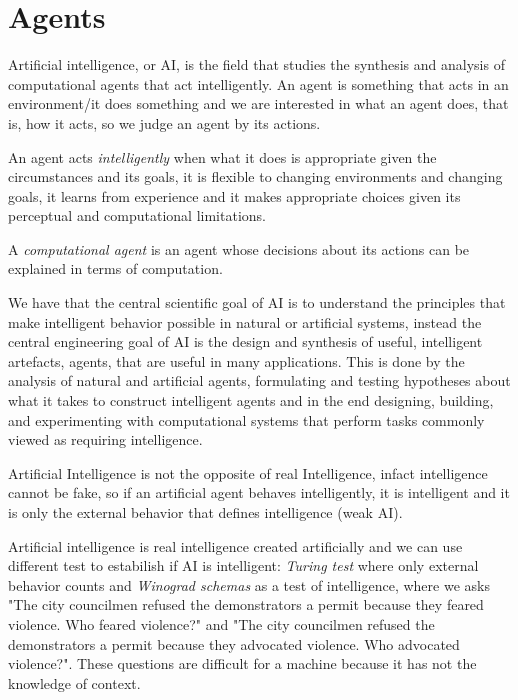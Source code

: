 \chapter{Agents}
Artificial intelligence, or AI, is the field that studies the synthesis and analysis of computational agents
that act intelligently.\newline
An agent is something that acts in an environment/it does something and we are interested in what an agent does,
that is, how it acts, so we judge an agent by its actions.

An agent acts \emph{intelligently} when what it does is appropriate given the circumstances and its goals,
it is flexible to changing environments and changing goals, it learns from experience and 
it makes appropriate choices given its perceptual and computational limitations.

\begin{defi}
A \emph{computational agent} is an agent whose decisions about its actions can be explained 
in terms of computation.
\end{defi}
We have that the central scientific goal of AI is to understand the principles that make intelligent behavior
possible in natural or artificial systems, instead the central engineering goal of AI is the design and synthesis of
useful, intelligent artefacts, agents, that are useful in many applications.\newline
This is done by the analysis of natural and artificial agents, formulating and testing hypotheses about
what it takes to construct intelligent agents and in the end designing, building, and experimenting
with computational systems that perform tasks commonly viewed as requiring intelligence.

Artificial Intelligence is not the opposite of real Intelligence, infact intelligence cannot be fake, so
if an artificial agent behaves intelligently, it is intelligent and it is only the external behavior
that defines intelligence (weak AI).

Artificial intelligence is real intelligence created artificially and we can use different test to 
estabilish if AI is intelligent: \emph{Turing test} where only external behavior counts and \emph{Winograd schemas}
as a test of intelligence, where we asks "The city councilmen refused the demonstrators a permit 
because they feared violence. Who feared violence?" and "The city councilmen refused the demonstrators a permit
because they advocated violence. Who advocated violence?".\newline
These questions are difficult for a machine because it has not the knowledge of context.

